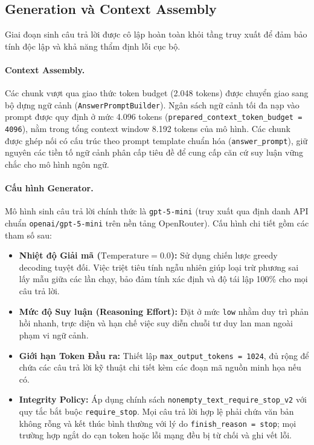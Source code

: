 \subsection{Generation và Context Assembly}
\label{subsec:generation_context}

Giai đoạn sinh câu trả lời được cô lập hoàn toàn khỏi tầng truy xuất để đảm bảo tính độc lập và khả năng thẩm định lỗi cục bộ.

\paragraph{Context Assembly.}
Các chunk vượt qua giao thức token budget (2.048 tokens) được chuyển giao sang bộ dựng ngữ cảnh (\texttt{AnswerPromptBuilder}). Ngân sách ngữ cảnh tối đa nạp vào prompt được quy định ở mức 4.096 tokens (\texttt{prepared\_context\_token\_budget = 4096}), nằm trong tổng context window 8.192 tokens của mô hình. Các chunk được ghép nối có cấu trúc theo prompt template chuẩn hóa (\texttt{answer\_prompt}), giữ nguyên các tiền tố ngữ cảnh phân cấp tiêu đề để cung cấp căn cứ suy luận vững chắc cho mô hình ngôn ngữ.

\paragraph{Cấu hình Generator.}
Mô hình sinh câu trả lời chính thức là \texttt{gpt-5-mini} (truy xuất qua định danh API chuẩn \texttt{openai/gpt-5-mini} trên nền tảng OpenRouter). Cấu hình chi tiết gồm các tham số sau:
\begin{itemize}
    \item \textbf{Nhiệt độ Giải mã ($\text{Temperature} = 0.0$):} Sử dụng chiến lược greedy decoding tuyệt đối. Việc triệt tiêu tính ngẫu nhiên giúp loại trừ phương sai lấy mẫu giữa các lần chạy, bảo đảm tính xác định và độ tái lập 100\% cho mọi câu trả lời.
    \item \textbf{Mức độ Suy luận (Reasoning Effort):} Đặt ở mức \texttt{low} nhằm duy trì phản hồi nhanh, trực diện và hạn chế việc suy diễn chuỗi tư duy lan man ngoài phạm vi ngữ cảnh.
    \item \textbf{Giới hạn Token Đầu ra:} Thiết lập \texttt{max\_output\_tokens = 1024}, đủ rộng để chứa các câu trả lời kỹ thuật chi tiết kèm các đoạn mã nguồn minh họa nếu có.
    \item \textbf{Integrity Policy:} Áp dụng chính sách \texttt{nonempty\_text\_require\_stop\_v2} với quy tắc bắt buộc \texttt{require\_stop}. Mọi câu trả lời hợp lệ phải chứa văn bản không rỗng và kết thúc bình thường với lý do \texttt{finish\_reason = stop}; mọi trường hợp ngắt do cạn token hoặc lỗi mạng đều bị từ chối và ghi vết lỗi.
\end{itemize}

